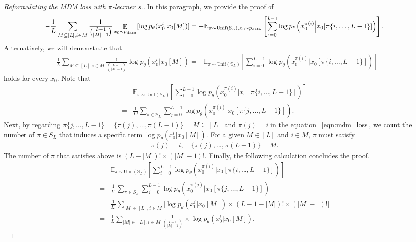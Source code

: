 \begin{proof}[Reformulating the MDM loss with $\pi$-learner s.]
In this paragraph, we provide the proof of 
\begin{align*}
   -\frac{1}{L}\sum_{ M\subseteq [L],i \in M}\frac{1}{\binom{L-1}{|M|-1}} \displaystyle \mathop{\mathbb{E}}_{x_0 \sim p_{\textrm data}} [ \log p_\theta(x^i_0 | x_0[M]) ] =-\mathbb{E}_{\pi\sim\mathrm{Unif}(\mathbb{S}_L),x_0\sim p_{\rm{data}}}\left[\sum_{i=0}^{L-1} \log p_\theta \left( x_0^{\pi(i)} \Big| x_0 [\pi\{i,\ldots,L-1\}] \right) \right].
\end{align*}
Alternatively, we will demonstrate that
\begin{align*}
   -\frac{1}{L}\sum_{ M\subseteq [L],i \in M}\frac{1}{\binom{L-1}{|M|-1}} \displaystyle   \log p_\theta(x^i_0 | x_0[M])  =-\mathbb{E}_{\pi\sim\mathrm{Unif}(\mathbb{S}_L)}\left[\sum_{i=0}^{L-1} \log p_\theta \left( x_0^{\pi(i)} \Big| x_0 [\pi\{i,\ldots,L-1\}] \right) \right]
\end{align*}
holds for every $x_0$. Note that
\begin{align*}
   & \mathbb{E}_{\pi\sim\mathrm{Unif}(\mathbb{S}_L)}\left[\sum_{i=0}^{L-1} \log p_\theta \left( x_0^{\pi(i)} \Big| x_0 [\pi\{i,\ldots,L-1\}] \right) \right] \\
    = &\frac{1}{L!}\sum_{\pi \in \mathbb{S}_L} \sum_{j=0}^{L-1} \log p_\theta \left( x_0^{\pi(j)} \Big| x_0 [\pi\{j,\ldots,L-1\}] \right).
\end{align*}
Next, by regarding $\pi\{j,\dots,L-1\} = \{\pi(j),\dots,\pi(L-1) \}=M \subseteq [L]$ and $\pi(j) =i $ in the equation ~\eqref{eqn:mdm_loss}, we count the number of $\pi \in S_L$ that induces a specific term $\log p_\theta(x_0^i | x_0[M])$. For a given $M\in [L]$ and $i \in M$, $\pi$ must satisfy
\begin{align*}
    \pi(j) = i, \quad  \{\pi(j),\dots,\pi(L-1) \}=M.
\end{align*}
The number of $\pi$ that satisfies above is $(L-|M|)! \times (|M|-1)!$. Finally, the following calculation concludes the proof.
\begin{align*}
&\mathbb{E}_{\pi\sim\mathrm{Unif}(\mathbb{S}_L)}\left[\sum_{i=0}^{L-1} \log p_\theta \left( x_0^{\pi(i)} \Big| x_0 [\pi\{i,\ldots,L-1\}] \right) \right] \\
=&\frac{1}{L!}\sum_{\pi \in S_L} \sum_{j=0}^{L-1} \log p_\theta \left( x_0^{\pi(j)} \Big| x_0 [\pi\{j,\ldots,L-1\}] \right) \\
=& \frac{1}{L!}\sum_{|M| \in [L], i \in M} \big[\log p_\theta(x_0^i | x_0[M]) \times(L-1-|M|)! \times (|M|-1)! \big] \\
=& \frac{1}{L}\sum_{|M| \in [L], i \in M} \frac{1}{\binom{L-1}{|M|-1}}\times \log p_\theta(x_0^i | x_0[M]).
\end{align*}
\end{proof}